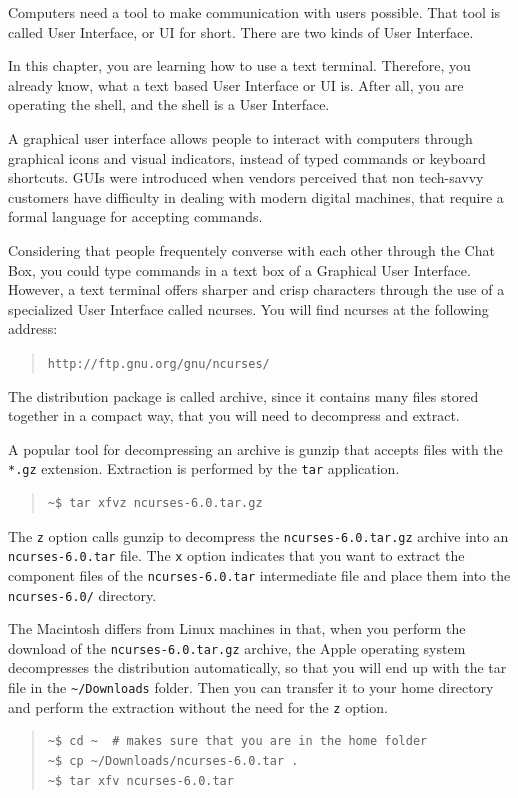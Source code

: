 \documentclass[a4paper,12pt]{book}
\begin{document}
Computers need a tool to make communication
with users possible. That tool is
called User Interface, or UI for short.
There are two kinds of User Interface.

In this chapter, you are learning how to use a
text terminal. Therefore, you already know,
what a text based User Interface or UI is.
After all, you are operating the shell,
and the shell is a User Interface.

A graphical user interface
allows people to interact with
computers through graphical icons and
visual indicators, instead of 
typed commands or keyboard shortcuts.
GUIs were introduced when vendors
perceived that non tech-savvy customers have
difficulty in dealing with modern
digital machines, that require a formal
language for accepting commands.

Considering that people frequentely
converse with each other through
the Chat Box, you could type commands
in a text box of a Graphical User
Interface. However, a text terminal
offers sharper and crisp characters
through the use of a specialized
User Interface called ncurses.
You will find ncurses at
the following address:
\begin{quote}
\verb|http://ftp.gnu.org/gnu/ncurses/|
\end{quote}
The distribution package is called
archive, since it contains many
files stored together in a compact way,
that you will need to decompress
and extract.

A popular tool for decompressing an archive
is gunzip that accepts files with the \verb|*.gz|
extension. Extraction is performed by the \verb|tar|
application.
\begin{quote}
\begin{verbatim}
~$ tar xfvz ncurses-6.0.tar.gz
\end{verbatim}
\end{quote}
The \verb|z| option calls gunzip to
decompress the
\verb|ncurses-6.0.tar.gz| archive into
an \verb|ncurses-6.0.tar| file. The
\verb|x| option indicates that
you want to extract the component
files of the \verb|ncurses-6.0.tar| intermediate
file and place them into the \verb|ncurses-6.0/|
directory.

The Macintosh differs from Linux machines
in that, when you perform the download of the
\verb|ncurses-6.0.tar.gz| archive, the
Apple operating system decompresses the distribution
automatically, so that you will end up
with the tar file in the \verb|~/Downloads|
folder. Then you can transfer it to your home directory
and perform the extraction without the need for the
\verb|z| option.
\begin{quote}
\begin{verbatim}
~$ cd ~  # makes sure that you are in the home folder
~$ cp ~/Downloads/ncurses-6.0.tar .
~$ tar xfv ncurses-6.0.tar
\end{verbatim}
\end{quote}
\end{document}
